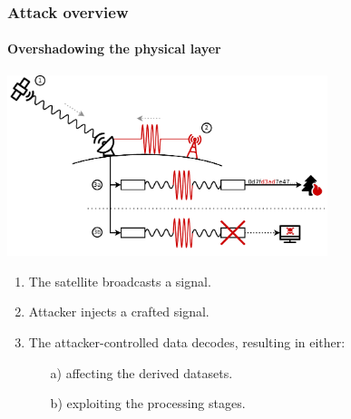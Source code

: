 \documentclass{beamer}
\begin{document}
\begin{frame}
  \frametitle{Attack overview}
  \framesubtitle{Overshadowing the physical layer}
  \centering
  \includegraphics[width=0.7\textwidth]{images/attack_illustration.pdf}
  \begin{enumerate}
    \item The satellite broadcasts a signal.
    \item Attacker injects a crafted signal.
    \item The attacker-controlled data decodes, resulting in either:
      \begin{enumerate}
        \item[a)] affecting the derived datasets.
        \item[b)] exploiting the processing stages.
      \end{enumerate}
  \end{enumerate}
\end{frame}

\end{document}
